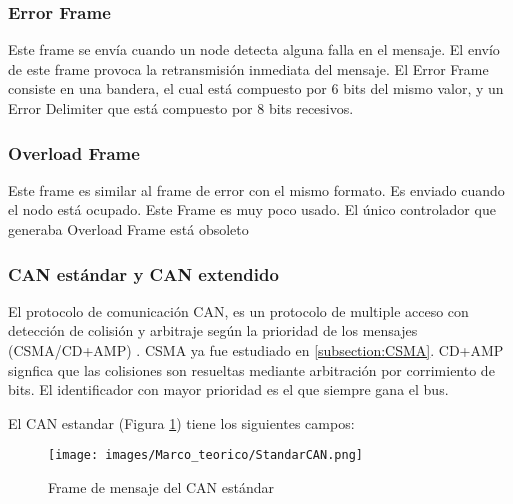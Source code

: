 \subsubsection{Error Frame}
Este frame se envía cuando un node detecta alguna falla en el mensaje. El envío de este frame provoca la retransmisión inmediata del mensaje. El Error Frame consiste en una bandera, el cual está compuesto por 6 bits del mismo valor, y un Error Delimiter que está compuesto por 8 bits recesivos.

\subsubsection{Overload Frame}
Este frame es similar al frame de error con el mismo formato. Es enviado cuando el nodo está ocupado. Este Frame es muy poco usado. El único controlador que generaba Overload Frame está obsoleto \citep{kvaserWEB}

\subsubsection{CAN estándar y CAN extendido}
El protocolo de comunicación CAN, es un protocolo de multiple acceso con detección de colisión y arbitraje según la prioridad de los mensajes (CSMA/CD+AMP) \citep{texasCAN}. CSMA ya fue estudiado en \ref{subsection:CSMA}. CD+AMP signfica que las colisiones son resueltas mediante arbitración por corrimiento de bits. El identificador con mayor prioridad es el que siempre gana el bus.

El CAN estandar (Figura \ref{fig:StandarCAN}) tiene los siguientes campos:

\begin{figure}[h]
 \centering
 \texttt{[image: images/Marco\_teorico/StandarCAN.png]}
  \caption{Frame de mensaje del CAN estándar}
\label{fig:StandarCAN}
\end{figure}

